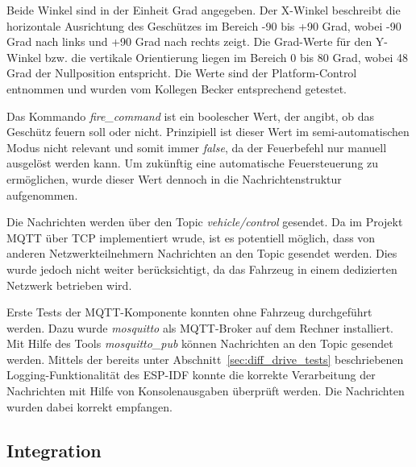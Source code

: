 
Beide Winkel sind in der Einheit Grad angegeben. Der X-Winkel beschreibt die horizontale Ausrichtung des Geschützes im Bereich -90 bis +90 Grad, wobei -90 Grad nach links und +90 Grad nach rechts zeigt. Die Grad-Werte für den Y-Winkel bzw. die vertikale Orientierung liegen im Bereich 0 bis 80 Grad, wobei 48 Grad der Nullposition entspricht. Die Werte sind der Platform-Control entnommen und wurden vom Kollegen Becker entsprechend getestet. \newline

Das Kommando \textit{fire\_command} ist ein boolescher Wert, der angibt, ob das Geschütz feuern soll oder nicht. Prinzipiell ist dieser Wert im semi-automatischen Modus nicht relevant und somit immer \textit{false}, da der Feuerbefehl nur manuell ausgelöst werden kann. Um zukünftig eine automatische Feuersteuerung zu ermöglichen, wurde dieser Wert dennoch in die Nachrichtenstruktur aufgenommen. \newline

Die Nachrichten werden über den Topic \textit{vehicle/control} gesendet. Da im Projekt MQTT über TCP implementiert wrude, ist es potentiell möglich, dass von anderen Netzwerkteilnehmern Nachrichten an den Topic gesendet werden. Dies wurde jedoch nicht weiter berücksichtigt, da das Fahrzeug in einem dedizierten Netzwerk betrieben wird. \newline

Erste Tests der MQTT-Komponente konnten ohne Fahrzeug durchgeführt werden. Dazu wurde \textit{mosquitto} als MQTT-Broker auf dem Rechner installiert. Mit Hilfe des Tools \textit{mosquitto\_pub} können Nachrichten an den Topic gesendet werden. Mittels der bereits unter Abschnitt~\ref{sec:diff_drive_tests} beschriebenen Logging-Funktionalität des ESP-IDF konnte die korrekte Verarbeitung der Nachrichten mit Hilfe von Konsolenausgaben überprüft werden. Die Nachrichten wurden dabei korrekt empfangen.

\subsection{Integration}

